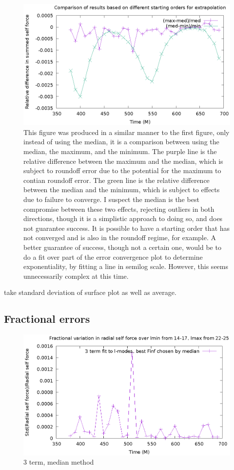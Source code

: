 \begin{figure}
  \includegraphics{minmaxmedrelativeerror3termavgl.eps}
  \caption{This figure was produced in a similar manner to the first figure, only instead of using the median, it is a comparison between using the median, the maximum, and the minimum. The purple line is the relative difference between the maximum and the median, which is subject to roundoff error due to the potential for the maximum to contian roundoff error. The green line is the relative difference between the median and the minimum, which is subject to effects due to failure to converge. I suspect the median is the best compromise between these two effects, rejecting outliers in both directions, though it is a simplistic approach to doing so, and does not guarantee success. It is possible to have a starting order that has not converged and is also in the roundoff regime, for example. A better guarantee of success, though not a certain one, would be to do a fit over part of the error convergence plot to determine exponentiality, by fitting a line in semilog scale. However, this seems unnecessarily complex at this time.}
\end{figure}
  



take standard deviation of surface plot as well as average.


\subsection{Fractional errors}
\begin{figure}
  \includegraphics{fractionalErrorSelfForceOverTime3termMedian}
  \caption{3 term, median method}
\end{figure}

